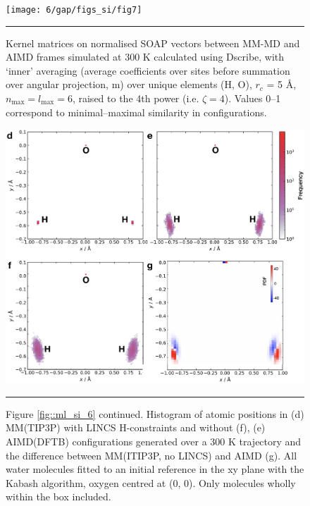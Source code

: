 \documentclass[../../main.tex]{subfiles}
\begin{document}
\begin{figure}[h!]
	\vspace{0.4cm}
	\centering
	\texttt{[image: 6/gap/figs\_si/fig7]}
	\vspace{0.2cm}
	\hrule
	\caption{Kernel matrices on normalised SOAP vectors between MM-MD and AIMD frames simulated at 300 K calculated using Dscribe,\cite{Himanen2020} with ‘inner’ averaging (average coefficients over sites before summation over angular projection, m) over unique elements (H, O), $r_c$ = 5 \AA, $n_\text{max}=l_\text{max}=6$, raised to the 4th power (i.e. $\zeta=4$). Values 0--1 correspond to minimal–maximal similarity in configurations.}
	\label{fig::ml_si_7}
\end{figure}




\begin{figure}[h!]
	\vspace{0.4cm}
	\centering
	\includegraphics[width=\textwidth]{6/gap/figs_si/fig7cont}
	\vspace{0.2cm}
	\hrule
	\caption{Figure \ref{fig::ml_si_6} continued. Histogram of atomic positions in (d) MM(TIP3P) with LINCS H-constraints and without (f), (e) AIMD(DFTB) configurations generated over a 300 K trajectory and the difference between MM(ITIP3P, no LINCS) and AIMD (g). All water molecules fitted to an initial reference in the xy plane with the Kabash algorithm, oxygen centred at (0, 0). Only molecules wholly within the box included.}
	\label{fig::ml_si_7cont}
\end{figure}
\end{document}
